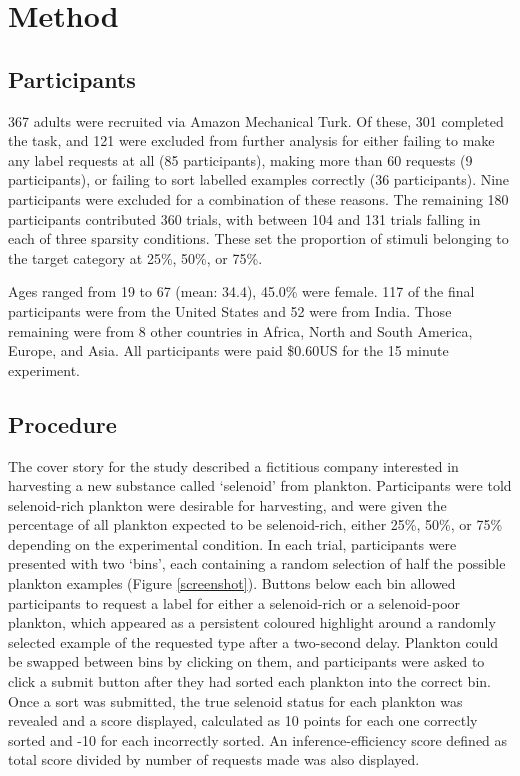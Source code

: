 \documentclass[10pt,letterpaper]{article}
\begin{document}
\section*{Method}

\subsection{Participants}

367 adults were recruited via Amazon Mechanical Turk.%
Of these, 301 completed the task, and 121 were excluded from further analysis for either failing to make any label requests at all (85 participants), making more than 60 requests (9 participants), or failing to sort labelled examples correctly (36 participants). Nine participants were excluded for a combination of these reasons.%
The remaining 180 participants contributed 360 trials, with between 104 and 131 trials falling in each of three sparsity conditions. These set the proportion of stimuli belonging to the target category at 25\%, 50\%, or 75\%.

Ages ranged from 19 to 67 (mean: 34.4), 45.0\% were female. 117 of the final participants were from the United States and 52 were from India. Those remaining were from 8 other countries in Africa, North and South America, Europe, and Asia. All participants were paid \$0.60US for the 15 minute experiment.

\subsection{Procedure}

The cover story for the study described a fictitious company interested in harvesting a new substance called `selenoid' from plankton. Participants were told selenoid-rich plankton were desirable for harvesting, and were given the percentage of all plankton expected to be selenoid-rich, either 25\%, 50\%, or 75\% depending on the experimental condition. In each trial, participants were presented with two `bins', each containing a random selection of half the possible plankton examples (Figure \ref{screenshot}). Buttons below each bin allowed participants to request a label for either a selenoid-rich or a selenoid-poor plankton, which appeared as a persistent coloured highlight around a randomly selected example of the requested type after a two-second delay. Plankton could be swapped between bins by clicking on them, and participants were asked to click a \textsf{submit} button after they had sorted each plankton into the correct bin. Once a sort was submitted, the true selenoid status for each plankton was revealed and a score displayed, calculated as 10 points for each one correctly sorted and -10 for each incorrectly sorted. An inference-efficiency score defined as total score divided by number of requests made was also displayed. 
\end{document}
